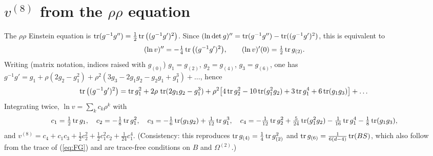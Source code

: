 \section{$v^{(8)}$ from the $\rho\rho$ equation}
The $\rho\rho$ Einstein equation is $\operatorname{tr}(g^{-1}g'')=\frac12\operatorname{tr}\big((g^{-1}g')^2\big)$. Since $(\ln\det g)''=\operatorname{tr}(g^{-1}g'')-\operatorname{tr}((g^{-1}g')^2)$, this is equivalent to
\begin{equation}
(\ln v)''=-\tfrac14\operatorname{tr}\big((g^{-1}g')^2\big),\qquad (\ln v)'(0)=\tfrac12\operatorname{tr} g_{(2)} .
\end{equation}
Writing (matrix notation, indices raised with $g_{(0)}$) $g_1=g_{(2)}$, $g_2=g_{(4)}$, $g_3=g_{(6)}$, one has $g^{-1}g'=g_1+\rho(2g_2-g_1^2)+\rho^2(3g_3-2g_1g_2-g_2g_1+g_1^3)+\dots$, hence
\begin{equation}
\operatorname{tr}\big((g^{-1}g')^2\big)=\operatorname{tr} g_1^2+2\rho\,\operatorname{tr}(2g_1g_2-g_1^3)+\rho^2\big[4\operatorname{tr} g_2^2-10\operatorname{tr}(g_1^2g_2)+3\operatorname{tr} g_1^4+6\operatorname{tr}(g_1g_3)\big]+\dots
\end{equation}
Integrating twice, $\ln v=\sum_k c_k\rho^k$ with
\begin{equation}
c_1=\tfrac12\operatorname{tr} g_1,\quad c_2=-\tfrac18\operatorname{tr} g_1^2,\quad c_3=-\tfrac16\operatorname{tr}(g_1g_2)+\tfrac1{12}\operatorname{tr} g_1^3,\quad
c_4=-\tfrac1{12}\operatorname{tr} g_2^2+\tfrac5{24}\operatorname{tr}(g_1^2g_2)-\tfrac1{16}\operatorname{tr} g_1^4-\tfrac18\operatorname{tr}(g_1g_3),
\end{equation}
and $v^{(8)}=c_4+c_1c_3+\frac12c_2^2+\frac12c_1^2c_2+\frac1{24}c_1^4$. (Consistency: this reproduces $\operatorname{tr} g_{(4)}=\frac14\operatorname{tr} g_{(2)}^2$ and $\operatorname{tr} g_{(6)}=\frac{1}{6(d-4)}\operatorname{tr}(BS)$, which also follow from the trace of (\ref{eq:FG}) and are trace-free conditions on $B$ and $\Omega^{(2)}$.)

